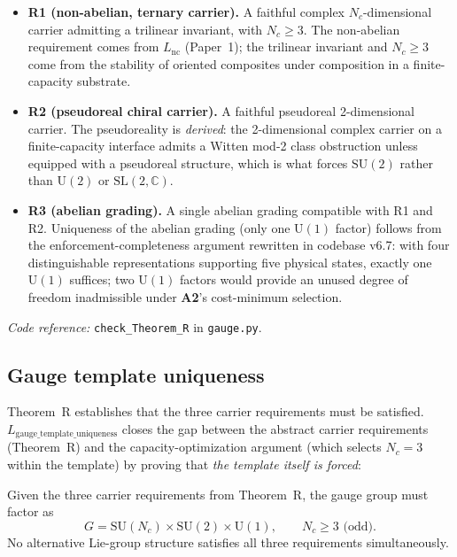 \documentclass[11pt]{article}
\newcommand{\coderef}[2]{\smallskip\noindent\textit{Code reference:} \texttt{#1} in \texttt{#2}.}
\newcommand{\SU}{\mathrm{SU}}
\newcommand{\Un}{\mathrm{U}}
\newcommand{\epitag}[1]{\textbf{[#1]}}
\newcommand{\Atwo}{\textbf{A2}}
\theoremstyle{definition}
\begin{document}
\begin{itemize}
    \item \textbf{R1 (non-abelian, ternary carrier).} A faithful complex $N_c$-dimensional carrier admitting a trilinear invariant, with $N_c \geq 3$. The non-abelian requirement comes from $L_{\mathrm{nc}}$ (Paper~1); the trilinear invariant and $N_c \geq 3$ come from the stability of oriented composites under composition in a finite-capacity substrate.
    \item \textbf{R2 (pseudoreal chiral carrier).} A faithful pseudoreal 2-dimensional carrier. The pseudoreality is \emph{derived}: the 2-dimensional complex carrier on a finite-capacity interface admits a Witten mod-2 class obstruction unless equipped with a pseudoreal structure, which is what forces $\SU(2)$ rather than $\Un(2)$ or $\mathrm{SL}(2,\mathbb{C})$.
    \item \textbf{R3 (abelian grading).} A single abelian grading compatible with R1 and R2. Uniqueness of the abelian grading (only one $\Un(1)$ factor) follows from the enforcement-completeness argument rewritten in codebase v6.7: with four distinguishable representations supporting five physical states, exactly one $\Un(1)$ suffices; two $\Un(1)$ factors would provide an unused degree of freedom inadmissible under \Atwo{}'s cost-minimum selection.
\end{itemize}

\coderef{check\_Theorem\_R}{gauge.py}

\subsection{Gauge template uniqueness}\label{sec:gauge_template_uniqueness}

Theorem~R establishes that the three carrier requirements must be satisfied. $L_{\mathrm{gauge\_template\_uniqueness}}$ closes the gap between the abstract carrier requirements (Theorem~R) and the capacity-optimization argument (which selects $N_c = 3$ within the template) by proving that \emph{the template itself is forced}:

\begin{tcolorbox}[apfbox, title={$L_{\mathrm{gauge\_template\_uniqueness}}$ \epitag{P}}]
Given the three carrier requirements from Theorem~R, the gauge group must factor as
\[
G = \SU(N_c) \times \SU(2) \times \Un(1), \qquad N_c \geq 3 \text{ (odd)}.
\]
No alternative Lie-group structure satisfies all three requirements simultaneously.
\end{tcolorbox}
\end{document}

